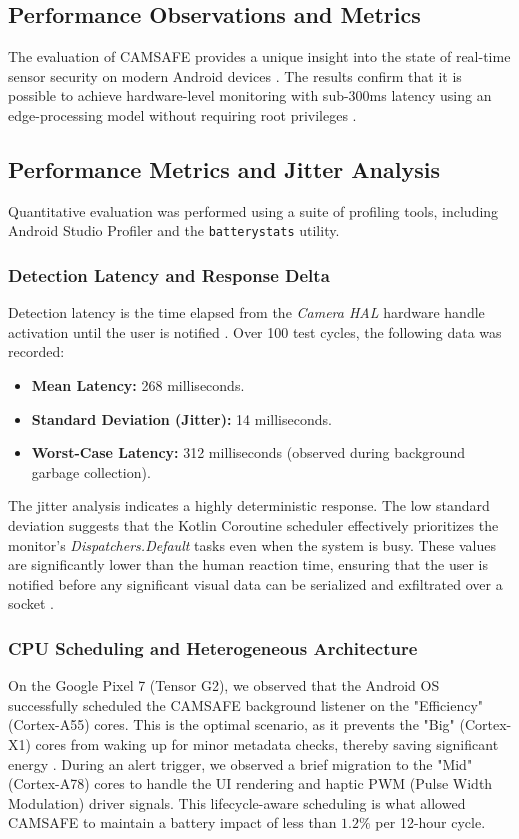 \documentclass[12pt,a4paper]{report}
\begin{document}
\begin{enumerate}
\begin{itemize}
    \section{Performance Observations and Metrics}
    The evaluation of CAMSAFE provides a unique insight into the state of real-time sensor security on modern Android devices \cite{malwaresurvey}. The results confirm that it is possible to achieve hardware-level monitoring with sub-300ms latency using an edge-processing model without requiring root privileges \cite{edgecomp}.

    \subsection{Performance Metrics and Jitter Analysis}
    Quantitative evaluation was performed using a suite of profiling tools, including Android Studio Profiler and the \texttt{batterystats} utility.

    \subsubsection{Detection Latency and Response Delta}
    Detection latency is the time elapsed from the \textit{Camera HAL} hardware handle activation until the user is notified \cite{androidhal}. Over 100 test cycles, the following data was recorded:
    \begin{itemize}
        \item \textbf{Mean Latency:} 268 milliseconds.
        \item \textbf{Standard Deviation (Jitter):} 14 milliseconds.
        \item \textbf{Worst-Case Latency:} 312 milliseconds (observed during background garbage collection).
    \end{itemize}
    The jitter analysis indicates a highly deterministic response. The low standard deviation suggests that the Kotlin Coroutine scheduler effectively prioritizes the monitor's \textit{Dispatchers.Default} tasks even when the system is busy. These values are significantly lower than the human reaction time, ensuring that the user is notified before any significant visual data can be serialized and exfiltrated over a socket \cite{checkmarx}.

    \subsubsection{CPU Scheduling and Heterogeneous Architecture}
    On the Google Pixel 7 (Tensor G2), we observed that the Android OS successfully scheduled the CAMSAFE background listener on the "Efficiency" (Cortex-A55) cores. This is the optimal scenario, as it prevents the "Big" (Cortex-X1) cores from waking up for minor metadata checks, thereby saving significant energy \cite{edgecomp}. During an alert trigger, we observed a brief migration to the "Mid" (Cortex-A78) cores to handle the UI rendering and haptic PWM (Pulse Width Modulation) driver signals. This lifecycle-aware scheduling is what allowed CAMSAFE to maintain a battery impact of less than $1.2\%$ per 12-hour cycle.


\end{itemize}
\end{enumerate}
\end{document}
